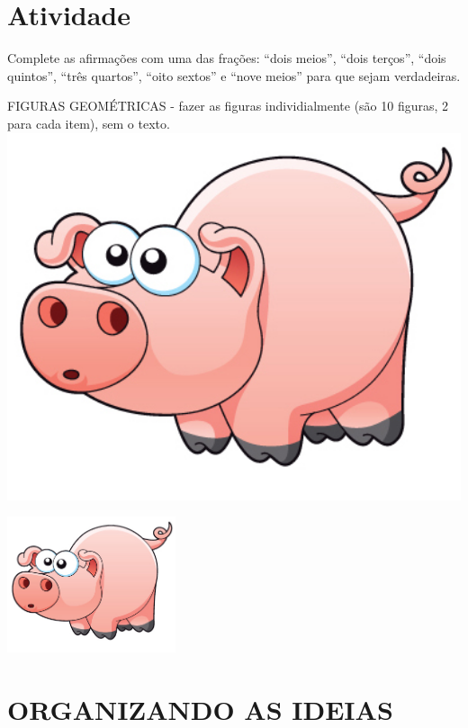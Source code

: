 \documentclass[a4,12pt]{book}
\begin{document}
\section{Atividade}







Complete as afirmações com uma das frações: ``dois meios'', ``dois terços'', ``dois quintos'', ``três quartos'', ``oito sextos'' e ``nove meios'' para que sejam verdadeiras.

\begin{imagem*}[breakable]{}{}   FIGURAS GEOMÉTRICAS -  fazer as figuras individialmente (são 10 figuras, 2 para cada item), sem o texto.   
    \includegraphics[width=420pt, keepaspectratio]{pig}  
\end{imagem*}






\includegraphics[width=\textwidth,height=4cm, keepaspectratio]{pig}


\section*{ ORGANIZANDO AS IDEIAS }
\end{document}
